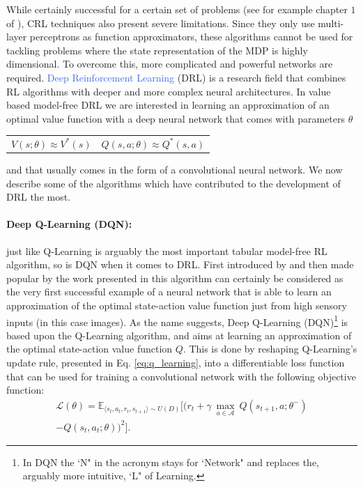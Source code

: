 While certainly successful for a certain set of problems (see for example chapter $1$ of \cite{sabatelli2017learning}), CRL techniques also present severe limitations. Since they only use multi-layer perceptrons as function approximators, these algorithms cannot be used for tackling problems where the state representation of the MDP is highly dimensional. To overcome this, more complicated and powerful networks are required. \textcolor{RoyalBlue}{Deep Reinforcement Learning} (DRL) \cite{arulkumaran2017deep, li2017deep, franccois2018introduction} is a research field that combines RL algorithms with deeper and more complex neural architectures. In value based model-free DRL we are interested in learning an approximation of an optimal value function with a deep neural network that comes with parameters $\theta$

\noindent
\begin{tabularx}{\linewidth}{@{}XX@{}}
\begin{equation}
	  V(s;\theta)\approx V^{*}(s)
	  \label{eq:v_approx}
  \end{equation}
&
\begin{equation}  
	Q(s,a;\theta)\approx Q^{*}(s,a)
	\label{eq:q_approx}
  \end{equation}
\end{tabularx}
and that usually comes in the form of a convolutional neural network. We now describe some of the algorithms which have contributed to the development of DRL the most. 


\paragraph{Deep Q-Learning (DQN):} just like Q-Learning is arguably the most important tabular model-free RL algorithm, so is DQN when it comes to DRL. First introduced by \citet{mnih2013playing} and then made popular by the work presented in \cite{mnih2015human} this algorithm can certainly be considered as the very first successful example of a neural network that is able to learn an approximation of the optimal state-action value function just from high sensory inputs (in this case images). As the name suggests, Deep Q-Learning (DQN)\footnote{In DQN the `N" in the acronym stays for `Network" and replaces the, arguably more intuitive, `L" of Learning.} is based upon the Q-Learning algorithm, and aims at learning an approximation of the optimal state-action value function $Q$. This is done by reshaping Q-Learning's update rule, presented in Eq. \ref{eq:q_learning}, into a differentiable loss function that can be used for training a convolutional network with the following objective function:
\begin{multline}
	\mathcal{L}(\theta) = \mathds{E}_{\langle s_{t},a_{t},r_{t},s_{t+1}\rangle\sim U(D)} \bigg[\big(r_{t} + \gamma \: \underset{a\in \mathcal{A}}{\max}\: Q(s_{t+1}, a; \theta^{-}) \\ - Q(s_{t}, a_{t}; \theta)\big)^{2}\bigg].
\label{eq:dqn}
\end{multline}

